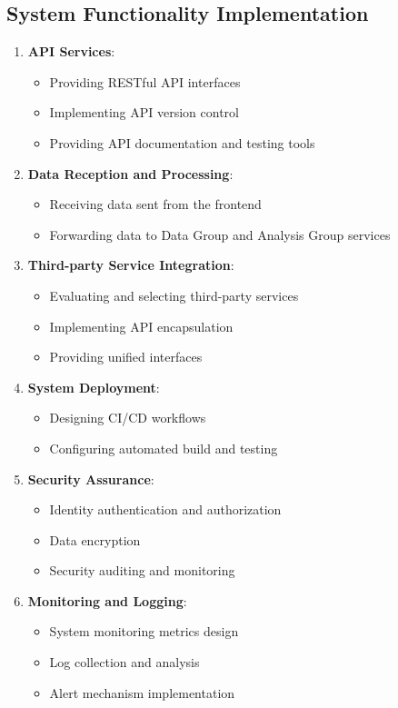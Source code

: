 \documentclass[a4paper,12pt]{article}
\begin{document}
\subsection{System Functionality Implementation}

\begin{enumerate}
  \item \textbf{API Services}:
    \begin{itemize}
      \item Providing RESTful API interfaces
      \item Implementing API version control
      \item Providing API documentation and testing tools
    \end{itemize}
  
  \item \textbf{Data Reception and Processing}:
    \begin{itemize}
      \item Receiving data sent from the frontend
      \item Forwarding data to Data Group and Analysis Group services
    \end{itemize}
  
  \item \textbf{Third-party Service Integration}:
    \begin{itemize}
      \item Evaluating and selecting third-party services
      \item Implementing API encapsulation
      \item Providing unified interfaces
    \end{itemize}
  
  \item \textbf{System Deployment}:
    \begin{itemize}
      \item Designing CI/CD workflows
      \item Configuring automated build and testing
    \end{itemize}
  
  \item \textbf{Security Assurance}:
    \begin{itemize}
      \item Identity authentication and authorization
      \item Data encryption
      \item Security auditing and monitoring
    \end{itemize}
  
  \item \textbf{Monitoring and Logging}:
    \begin{itemize}
      \item System monitoring metrics design
      \item Log collection and analysis
      \item Alert mechanism implementation
    \end{itemize}
\end{enumerate}
\end{document}
